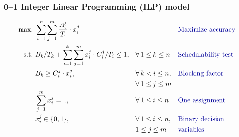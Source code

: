 \documentclass[svgnames,unknownkeysallowed]{beamer}
\begin{document}
\begin{frame}
	\frametitle{0–1 Integer Linear Programming  (ILP)  model}

{\scriptsize 	 
\begin{align}
	\text{max.}~
	& \sum_{i=1}^n \sum_{j=1}^m
	\frac{A_i^j}{T_i} \cdot x_i^j &&
	&& \text{\color{blue!60!black}Maximize accuracy}
	\label{model:obj}\\
	\text{s.t.}~
	& B_k/T_k + \sum_{i=1}^k \sum_{j=1}^m
	x_i^j \cdot C_i^j/T_i \leq 1,
	&& \forall\, 1 \leq k \leq n
	&& \text{\color{blue!60!black}Schedulability test}
	\label{model:const_sched}\\
	& B_k \geq C_i^j \cdot x_i^j,
	&& \forall\, k < i \leq n,
	&& \text{\color{blue!60!black}Blocking factor} 
	 \\
	& 
	&& \forall\, 1 \leq j \leq m
	&& \nonumber  \\
	& \sum_{j=1}^m x_i^j = 1,
	&& \forall\, 1 \leq i \leq n
	&& \text{\color{blue!60!black}One assignment}
	\label{model:const_only_one}\\
	& x_i^j \in \{0,1\},
	&& \forall\, 1 \leq i \leq n,
	&& \text{\color{blue!60!black}Binary decision} 
	\label{model:const_binary} \nonumber\\
	&  
	&& 
	1 \leq j \leq m
	&& \text{\color{blue!60!black}variables}
\end{align}


}
\end{frame}
\end{document}
